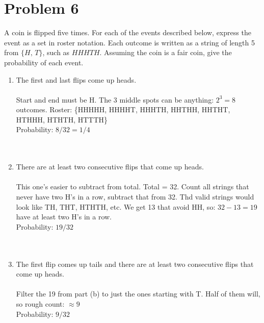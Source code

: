 \documentclass{amsart}
\theoremstyle{definition}
\theoremstyle{Exercise}
\theoremstyle{remark}
\theoremstyle{rule}
\numberwithin{equation}{section}
\begin{document}
\section*{Problem 6}
A coin is flipped five times. For each of the events described below, express the event as a set in roster notation. Each outcome is written as a string of length 5 from $\{H,\, T\}$, such as $HHHTH$. Assuming the coin is a fair coin, give the probability of each event.\\
\begin{enumerate}[label=(\alph*)]
\item The first and last flips come up heads.\\\\
Start and end must be H. The 3 middle spots can be anything: $2^3 = 8$ outcomes.
Roster: \{HHHHH, HHHHT, HHHTH, HHTHH, HHTHT, HTHHH, HTHTH, HTTTH\}\\
Probability: $8/32 = 1/4$\\

\\\\
\item There are at least two consecutive flips that come up heads.\\\\
This one’s easier to subtract from total. Total = 32. Count all strings that never have two H’s in a row, subtract that from 32.
Thd valid strings would look like TH, THT, HTHTH, etc.
We get 13 that avoid HH, so: $32 - 13 = 19$ have at least two H’s in a row.\\
Probability: $19/32$\\

\\\\
\item The first flip comes up tails and there are at least two consecutive flips that come up heads.\\\\
Filter the 19 from part (b) to just the ones starting with T. Half of them will, so rough count: $\approx 9$\\
Probability: $9/32$\\
\\\\
\end{enumerate}

 \newpage
\end{document}
